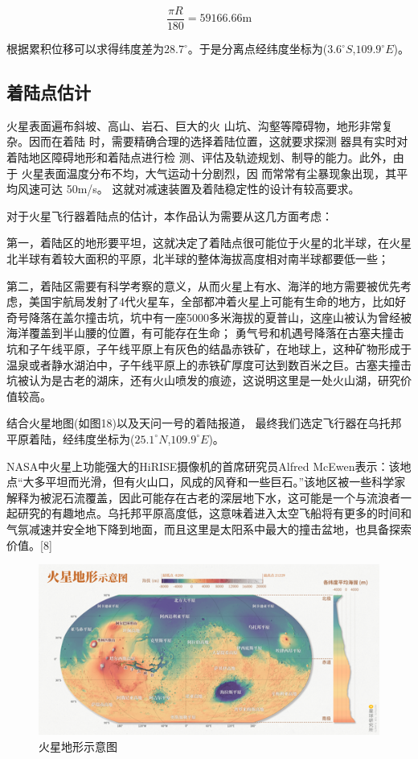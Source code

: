 \documentclass[UTF8,12pt]{ctexart}
\begin{document}
\begin{equation}
	\frac{\pi R}{180}=59166.66\mathrm{m}
\end{equation}

根据累积位移可以求得纬度差为$28.7^\circ$。于是分离点经纬度坐标为($3.6^\circ S$,$109.9^\circ E$)。

\subsection{着陆点估计}
火星表面遍布斜坡、高山、岩石、巨大的火
山坑、沟壑等障碍物，地形非常复杂。因而在着陆
时，需要精确合理的选择着陆位置，这就要求探测
器具有实时对着陆地区障碍地形和着陆点进行检
测、评估及轨迹规划、制导的能力。此外，由于
火星表面温度分布不均，大气运动十分剧烈，因
而常常有尘暴现象出现，其平均风速可达 50m/s。
这就对减速装置及着陆稳定性的设计有较高要求。

对于火星飞行器着陆点的估计，本作品认为需要从这几方面考虑：

第一，着陆区的地形要平坦，这就决定了着陆点很可能位于火星的北半球，在火星北半球有着较大面积的平原，北半球的整体海拔高度相对南半球都要低一些；

第二，着陆区需要有科学考察的意义，从而火星上有水、海洋的地方需要被优先考虑，美国宇航局发射了4代火星车，全部都冲着火星上可能有生命的地方，比如好奇号降落在盖尔撞击坑，坑中有一座5000多米海拔的夏普山，这座山被认为曾经被海洋覆盖到半山腰的位置，有可能存在生命；
勇气号和机遇号降落在古塞夫撞击坑和子午线平原，子午线平原上有灰色的结晶赤铁矿，在地球上，这种矿物形成于温泉或者静水湖泊中，子午线平原上的赤铁矿厚度可达到数百米之巨。古塞夫撞击坑被认为是古老的湖床，还有火山喷发的痕迹，这说明这里是一处火山湖，研究价值较高。

结合火星地图(如图18)以及天问一号的着陆报道，
最终我们选定飞行器在乌托邦平原着陆，经纬度坐标为($25.1^\circ N$,$109.9^\circ E$)。

NASA中火星上功能强大的HiRISE摄像机的首席研究员Alfred McEwen表示：该地点“大多平坦而光滑，但有火山口，风成的风脊和一些巨石。”该地区被一些科学家解释为被泥石流覆盖，因此可能存在古老的深层地下水，这可能是一个与流浪者一起研究的有趣地点。乌托邦平原高度低，这意味着进入太空飞船将有更多的时间和气氛减速并安全地下降到地面，而且这里是太阳系中最大的撞击盆地，也具备探索价值。[8]
\begin{figure}[htb]
	\centering
	\includegraphics[width=0.8\linewidth]{火星地形图.png}
	\caption{火星地形示意图}
	\label{fig:pathdemo}	
\end{figure}
\end{document}
